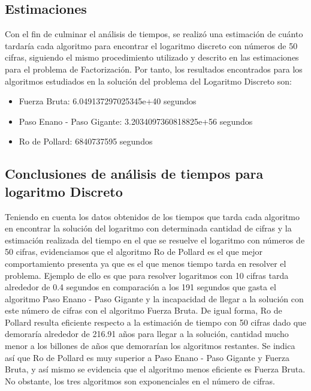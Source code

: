 \documentclass{article}
\begin{document}
    \subsection*{Estimaciones}
    Con el fin de culminar el análisis de tiempos, se realizó una estimación de cuánto tardaría cada algoritmo para encontrar el logaritmo discreto con números de 50 cifras, siguiendo el mismo procedimiento utilizado y descrito en las estimaciones para el problema de Factorización. 
    \newblock
    Por tanto, los resultados encontrados para los algoritmos estudiados en la solución del problema del Logaritmo Discreto son:
    \begin{itemize}
        \item Fuerza Bruta: 6.049137297025345e+40 segundos
        \item Paso Enano - Paso Gigante: 3.2034097360818825e+56 segundos
        \item Ro de Pollard: 6840737595 segundos
    \end{itemize}
    
    \subsection*{Conclusiones de análisis de tiempos para logaritmo Discreto}
    Teniendo en cuenta los datos obtenidos de los tiempos que tarda cada algoritmo en encontrar la solución del logaritmo con determinada cantidad de cifras y la estimación realizada del tiempo en el que se resuelve el logaritmo con números de 50 cifras, evidenciamos que el algoritmo Ro de Pollard es el que mejor comportamiento presenta ya que es el que menos tiempo tarda en resolver el problema. Ejemplo de ello es que para resolver logaritmos con 10 cifras tarda alrededor de 0.4 segundos en comparación a los 191 segundos que gasta el algoritmo Paso Enano - Paso Gigante y la incapacidad de llegar a la solución con este número de cifras con el algoritmo Fuerza Bruta.
    \newblock
    De igual forma, Ro de Pollard resulta eficiente respecto a la estimación de tiempo con 50 cifras dado que demoraría alrededor de 216.91 años para llegar a la solución, cantidad mucho menor a los billones de años que demorarían los algoritmos restantes.
    \newblock
    Se indica así que Ro de Pollard es muy superior a Paso Enano - Paso Gigante y Fuerza Bruta, y así mismo se evidencia que el algoritmo menos eficiente es Fuerza Bruta.
    \newblock
    No obstante, los tres algoritmos son exponenciales en el número de cifras.
\end{document}
